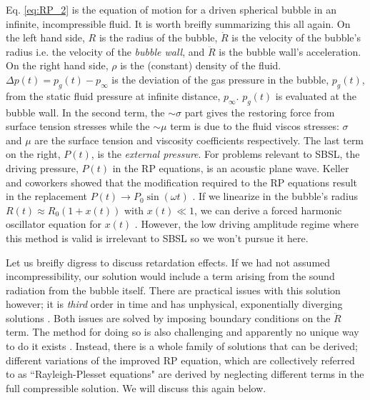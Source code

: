 \documentclass[rmp,aps,nofootinbib,superscriptaddress,floatfix]{revtex4-2}
\begin{document}
Eq. \ref{eq:RP_2} is the equation of motion for a driven spherical bubble in an infinite, incompressible fluid. It is worth breifly summarizing this all again. On the left hand side, $R$ is the radius of the bubble, $\dot{R}$ is the velocity of the bubble's radius i.e. the velocity of the \emph{bubble wall}, and $\ddot{R}$ is the bubble wall's acceleration. On the right hand side, $\rho$ is the (constant) density of the fluid. $\Delta p(t) = p_g(t)-p_\infty$ is the deviation of the gas pressure in the bubble, $p_g(t)$, from the static fluid pressure at infinite distance, $p_\infty$. $p_g(t)$ is evaluated at the bubble wall. In the second term, the $\sim \sigma$ part gives the restoring force from surface tension stresses while the $\sim \mu$ term is due to the fluid viscos stresses: $\sigma$ and $\mu$ are the surface tension and viscosity coefficients respectively. The last term on the right, $P(t)$, is the \emph{external pressure}. For problems relevant to SBSL, the driving pressure, $P(t)$ in the RP equations, is an acoustic plane wave. Keller and coworkers showed that the modification required to the RP equations result in the replacement $P(t) \rightarrow P_0 \sin(\omega t)$ \cite{keller1980bubble}. If we linearize in the bubble's radius $R(t)\approx R_0 \left( 1+x(t) \right)$ with $x(t) \ll 1$, we can derive a forced harmonic oscillator equation for $x(t)$ \cite{brennen2014cavitation,yasui2018acoustic}. However, the low driving amplitude regime where this method is valid is irrelevant to SBSL so we won't pursue it here.

Let us breifly digress to discuss retardation effects. If we had not assumed incompressibility, our solution would include a term arising from the sound radiation from the bubble itself. There are practical issues with this solution however; it is \emph{third} order in time and has unphysical, exponentially diverging solutions \cite{prosperetti1999old,brenner2002single,prosperetti1986bubble,lezzi1987bubble}. Both issues are solved by imposing boundary conditions on the $\ddot{R}$ term. The method for doing so is also challenging and apparently no unique way to do it exists \cite{prosperetti1986bubble,prosperetti1988nonlinear,keller1956damping}. Instead, there is a whole family of solutions that can be derived; different variations of the improved RP equation, which are collectively referred to as ``Rayleigh-Plesset equations" are derived by neglecting different terms in the full compressible solution. We will discuss this again below.
\end{document}
